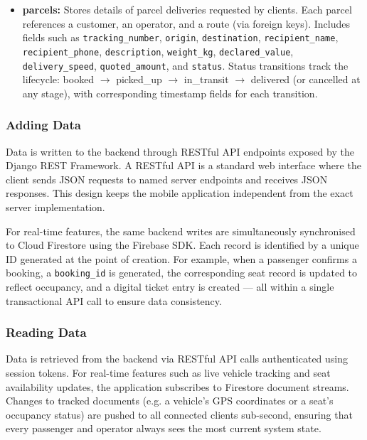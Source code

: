 \begin{itemize}
    \item \textbf{parcels:} Stores details of parcel deliveries requested by
    clients. Each parcel references a customer, an operator, and a route (via
    foreign keys). Includes fields such as \texttt{tracking\_number},
    \texttt{origin}, \texttt{destination}, \texttt{recipient\_name},
    \texttt{recipient\_phone}, \texttt{description}, \texttt{weight\_kg},
    \texttt{declared\_value}, \texttt{delivery\_speed}, \texttt{quoted\_amount},
    and \texttt{status}. Status transitions track the lifecycle: booked
    $\to$ picked\_up $\to$ in\_transit $\to$ delivered (or cancelled at any
    stage), with corresponding timestamp fields for each transition.

\end{itemize}

\subsubsection{Adding Data}

Data is written to the backend through RESTful API endpoints exposed by the
Django REST Framework. A RESTful API is a standard web interface where the
client sends JSON requests to named server endpoints and receives JSON
responses. This design keeps the mobile application independent from the exact
server implementation.

For real-time features, the same backend writes are simultaneously
synchronised to Cloud Firestore using the Firebase SDK. Each record is
identified by a unique ID generated at the point of creation. For example, when
a passenger confirms a booking, a \texttt{booking\_id} is generated, the
corresponding seat record is updated to reflect occupancy, and a digital ticket
entry is created — all within a single transactional API call to ensure data
consistency.



\subsubsection{Reading Data}

Data is retrieved from the backend via RESTful API calls authenticated using
session tokens. For real-time features such as live vehicle tracking and seat
availability updates, the application subscribes to Firestore document streams.
Changes to tracked documents (e.g. a vehicle's GPS coordinates or a seat's
occupancy status) are pushed to all connected clients sub-second, ensuring that
every passenger and operator always sees the most current system state.



